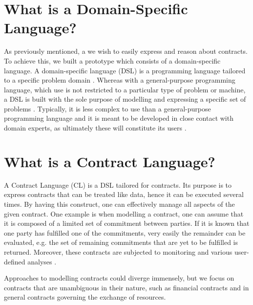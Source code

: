 \documentclass{ituthesis}
\begin{document}
\section{What is a Domain-Specific Language?}

As previously mentioned, a we wish to easily express and reason about contracts. To achieve this, we built a prototype which consists of a domain-specific language. A domain-specific language (DSL) is a programming language tailored to a specific problem domain \cite{whatsisadsl2005}. Whereas with a general-purpose programming language, which use is not restricted to a particular type of problem or machine, a DSL is built with the sole purpose of modelling and expressing a specific set of problems \cite{van2000domain}. %
Typically, it is less complex to use than a general-purpose programming language and it is meant to be developed in close contact with domain experts, as ultimately these will constitute its users \cite{dsl}.

\section{What is a Contract Language?}
A Contract Language (CL) is a DSL tailored for contracts. Its purpose is to express contracts that can be treated like data, hence it can be executed several times. By having this construct, one can effectively manage all aspects of the given contract. One example is when modelling a contract, one can assume that it is composed of a limited set of commitment between parties. If it is known that one party has fulfilled one of the commitments, very easily the remainder can be evaluated, e.g. the set of remaining commitments that are yet to be fulfilled is returned. Moreover, these contracts are subjected to monitoring and various user-defined analyses \cite{andersen2006compositional}.

Approaches to modelling contracts could diverge immensely, but we focus on contracts that are unambiguous in their nature, such as financial contracts and in general contracts governing the exchange of resources.
\end{document}
